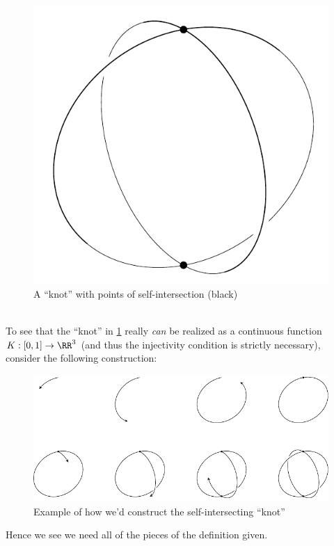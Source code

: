\begin{minipage}{.49\linewidth}
  \begin{figure}[H]
    \centering
    \includegraphics[scale=.3]{figures/background/self-intersect.pdf}
    \caption{A ``knot'' with points of self-intersection (black)}
    \label{fig:SelfIntersect}
  \end{figure}
\end{minipage}\\[1em]
To see that the ``knot'' in \cref{fig:SelfIntersect} really \emph{can}
be realized as a continuous function $K : [0,1] \to \RR^3$ (and thus
the injectivity condition is strictly necessary), consider the
following construction: %
\begin{figure}[H]
  \centering
  \includegraphics[scale=.8]{figures/background/self-intersect-cons.pdf}
  \caption{Example of how we'd construct the self-intersecting ``knot''}
\end{figure}
\noindent Hence we see we need all of the pieces of the definition
given.

